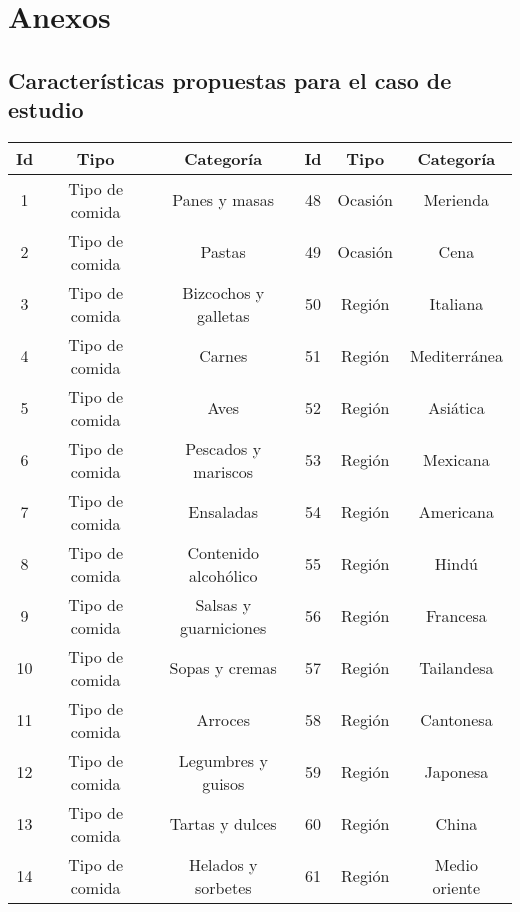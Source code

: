 \newpage
\chapter{Anexos}
\section{Características propuestas para el caso de estudio}
\begin{table}[h]
	\begin{center}
		\begin{tabular}{ | c | c | c | c | c | c |}
			\toprule
			Id & Tipo           & Categoría             & Id & Tipo     & Categoría    \\
			\midrule
			1  & Tipo de comida & Panes y masas          & 48 & Ocasión & Merienda      \\
			\midrule
			2  & Tipo de comida & Pastas                 & 49 & Ocasión & Cena          \\
			\midrule
			3  & Tipo de comida & Bizcochos y galletas   & 50 & Región  & Italiana      \\
			\midrule
			4  & Tipo de comida & Carnes                 & 51 & Región  & Mediterránea \\
			\midrule
			5  & Tipo de comida & Aves                   & 52 & Región  & Asiática     \\
			\midrule
			6  & Tipo de comida & Pescados y mariscos    & 53 & Región  & Mexicana      \\
			\midrule
			7  & Tipo de comida & Ensaladas              & 54 & Región  & Americana     \\
			\midrule
			8  & Tipo de comida & Contenido alcohólico  & 55 & Región  & Hindú        \\
			\midrule
			9  & Tipo de comida & Salsas y guarniciones  & 56 & Región  & Francesa      \\
			\midrule
			10 & Tipo de comida & Sopas y cremas         & 57 & Región  & Tailandesa    \\
			\midrule
			11 & Tipo de comida & Arroces                & 58 & Región  & Cantonesa     \\
			\midrule
			12 & Tipo de comida & Legumbres y guisos     & 59 & Región  & Japonesa      \\
			\midrule
			13 & Tipo de comida & Tartas y dulces        & 60 & Región  & China         \\
			\midrule
			14 & Tipo de comida & Helados y sorbetes     & 61 & Región  & Medio oriente \\

\end{tabular}
\end{center}
\end{table}
